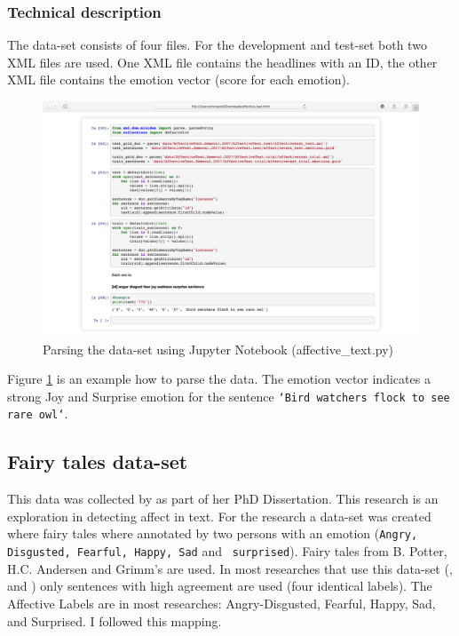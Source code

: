 \documentclass[
10pt, %
a4paper, %
oneside, %
headinclude,footinclude, %
BCOR5mm, %
]{scrartcl}
\begin{document}
\subsubsection{Technical description}
The data-set consists of four files. For the development and test-set both two XML files are used. One XML file contains the headlines with an ID, the other XML file contains the emotion vector (score for each emotion).
\begin{figure}[htb]
  \includegraphics[width=\linewidth]{dataset_affective.png}
  \caption{Parsing the data-set using Jupyter Notebook (affective\_text.py)}
  \label{fig:dataset_affective}
\end{figure}
Figure \ref{fig:dataset_affective} is an example how to parse the data. The emotion vector indicates a strong Joy and Surprise emotion for the sentence \texttt{`Bird watchers flock to see rare owl`}.


\subsection{Fairy tales data-set}
This data was collected by \citeauthor{alm2008affect} as part of her PhD Dissertation\citep{alm2008affect}. This research is an exploration in detecting affect in text. For the research a data-set was created where fairy tales where annotated by two persons with an emotion (\texttt{Angry, Disgusted, Fearful, Happy, Sad} and \texttt{ surprised}). Fairy tales  from B. Potter, H.C. Andersen and Grimm's are used. In most researches that use this data-set (\citet{kim2010evaluation}, \citet{calvo2013emotions} and \citet{chaffar2011using}) only sentences with high agreement are used (four identical labels). The Affective Labels are in most researches: Angry-Disgusted, Fearful, Happy, Sad, and Surprised. I followed this mapping.
\end{document}
